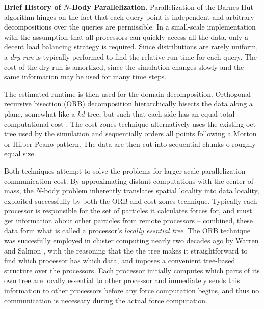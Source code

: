 \documentclass[times, leqno,twocolumn]{article}
\begin{document}

{\bf Brief History of $N$-Body Parallelization.}
Parallelization of the Barnes-Hut algorithm hinges on the fact that each query point is independent and arbitrary decompositions over the queries are permissible.
In a small-scale implementation with the assumption that all processors can quickly access all the data, only a decent load balancing strategy is required.
Since distributions are rarely uniform, a {\it dry run} is typically performed to find the relative run time for each query.
The cost of the dry run is amortized, since the simulation changes slowly and the same information may be used for many time steps.

The estimated runtime is then used for the domain decomposition.
Orthogonal recursive bisection (ORB) decomposition hierarchically bisects the data along a plane, somewhat like a $kd$-tree, but such that each side has an equal total computational cost \cite{singh95load, liu94experiences, salmon93parallel}.
The cost-zones technique alternatively uses the existing oct-tree used by the simulation and sequentially orders all points following a Morton or Hilber-Peano pattern.
The data are then cut into sequential chunks o roughly equal size.

Both techniques attempt to solve the problems for larger scale parallelization -- communication cost.
By approximating distant computations with the center of mass, the $N$-body problem inherently translates spatial locality into data locality, exploited successfully by both the ORB and cost-zones technique.
Typically each processor is responsible for the set of particles it calculates forces for, and must get information about other particles from remote processors -- combined, these data form what is called a processor's {\it locally essntial tree}.
The ORB technique was succesfully employed in cluster computing nearly two decades ago by Warren and Salmon \cite{warren92astrophysical}, with the reasoning that the the tree makes it straightforward to find which processor has which data, and imposes a convenient tree-based structure over the processors.
Each processor initially computes which parts of its own tree are locally essential to other processor and immediately sends this information to other processors before any force computation begins, and thus no communication is necessary during the actual force computation.
\end{document}
